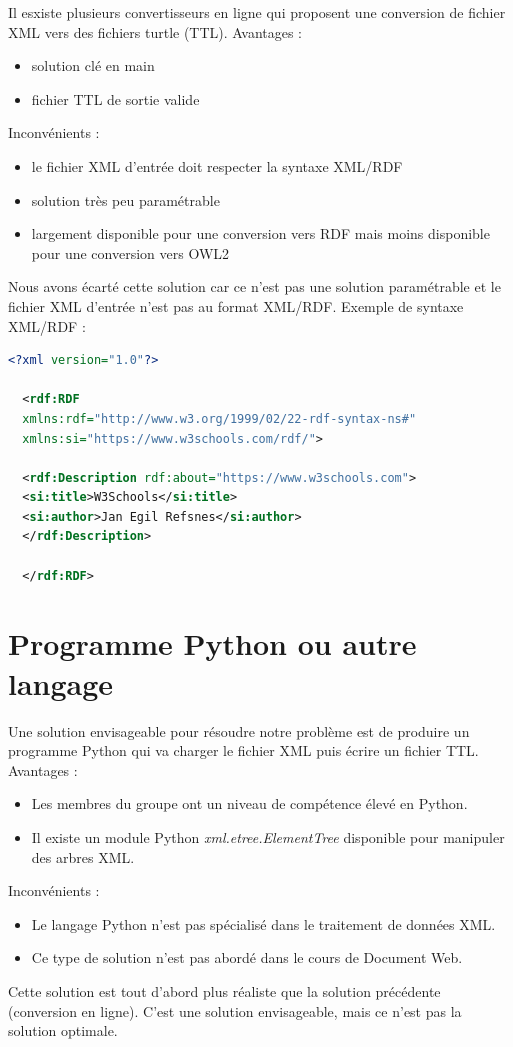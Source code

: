 \documentclass[11pt]{report}
\begin{document}
Il esxiste plusieurs convertisseurs en ligne qui proposent une conversion de fichier XML vers des fichiers turtle (TTL).
\hfill \break
Avantages :
\begin{itemize}
\item solution clé en main
\item fichier TTL de sortie valide
\end{itemize}
\hfill \break
Inconvénients :
\begin{itemize}
\item le fichier XML d'entrée doit respecter la syntaxe XML/RDF
\item solution très peu paramétrable
\item largement disponible pour une conversion vers RDF mais moins disponible pour une conversion vers OWL2
\end{itemize}
\hfill \break
Nous avons écarté cette solution car ce n'est pas une solution paramétrable et le fichier XML d'entrée n'est pas au format XML/RDF.
\hfill \break
Exemple de syntaxe XML/RDF :
\begin{lstlisting}[language=XML]
  <?xml version="1.0"?>

  <rdf:RDF
  xmlns:rdf="http://www.w3.org/1999/02/22-rdf-syntax-ns#"
  xmlns:si="https://www.w3schools.com/rdf/">

  <rdf:Description rdf:about="https://www.w3schools.com">
  <si:title>W3Schools</si:title>
  <si:author>Jan Egil Refsnes</si:author>
  </rdf:Description>

  </rdf:RDF> 
\end{lstlisting}

\section{Programme Python ou autre langage}

Une solution envisageable pour résoudre notre problème est de produire un programme Python qui va charger le fichier XML puis écrire un fichier TTL.
\hfill \break
Avantages :
\begin{itemize}
\item Les membres du groupe ont un niveau de compétence élevé en Python.
\item Il existe un module Python \emph{xml.etree.ElementTree} disponible pour manipuler des arbres XML.
\end{itemize}
\hfill \break
Inconvénients :
\begin{itemize}
\item Le langage Python n'est pas spécialisé dans le traitement de données XML.
\item Ce type de solution n'est pas abordé dans le cours de Document Web.
\end{itemize}
\hfill \break
Cette solution est tout d'abord plus réaliste que la solution précédente (conversion en ligne). C'est une solution envisageable, mais ce n'est pas la solution optimale.
\end{document}
